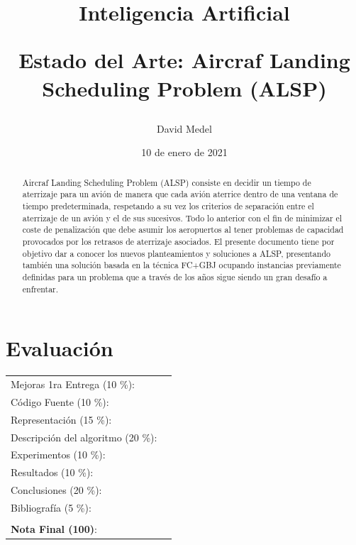 \documentclass[letter, 10pt]{article}
\begin{document}
\title{Inteligencia Artificial \\ \begin{Large}Estado del Arte: Aircraf Landing Scheduling Problem (ALSP)\end{Large}}
\author{David Medel}
\date{10 de enero de 2021}
\maketitle


\section*{Evaluaci\'on}

\begin{tabular}{ll}
Mejoras 1ra Entrega (10 \%): &  \underline{\hspace{2cm}}\\
C\'odigo Fuente (10 \%): &  \underline{\hspace{2cm}}\\
Representaci\'on (15 \%):  & \underline{\hspace{2cm}} \\
Descripci\'on del algoritmo (20 \%):  & \underline{\hspace{2cm}} \\
Experimentos (10 \%):  & \underline{\hspace{2cm}} \\
Resultados (10 \%):  & \underline{\hspace{2cm}} \\
Conclusiones (20 \%): &  \underline{\hspace{2cm}}\\
Bibliograf\'ia (5 \%): & \underline{\hspace{2cm}}\\
 &  \\
\textbf{Nota Final (100)}:   & \underline{\hspace{2cm}}
\end{tabular}
\vspace{1cm}


\begin{abstract}
 Aircraf Landing Scheduling Problem (ALSP) consiste en decidir un tiempo de aterrizaje para un avión de manera que cada avión aterrice dentro de una ventana de tiempo predeterminada, respetando a su vez los criterios de separación entre el aterrizaje de un avión y el de sus sucesivos. Todo lo anterior con el fin de minimizar el coste de penalización que debe asumir los aeropuertos al tener problemas de capacidad provocados por los retrasos de aterrizaje asociados.
 El presente documento tiene por objetivo dar a conocer los nuevos planteamientos y soluciones a ALSP, presentando también una solución basada en la técnica FC+GBJ ocupando instancias previamente definidas para un problema que a través de los años sigue siendo un gran desafío a enfrentar.

\end{abstract}
\end{document}
